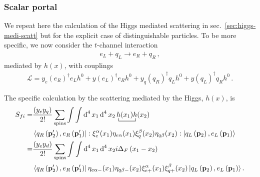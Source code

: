 \subsubsection{Scalar portal}

\begin{frame}
We repeat here the calculation of the Higgs mediated scattering in sec.~\ref{sec:higgs-medi-scatt} but for the explicit case of distinguishable particles. To be more specific, 
we now consider the $t$-channel interaction
\begin{align}
  e_L+q_L \to e_R+q_R\,,
\end{align}
mediated by $h(x)$, with couplings
\begin{align}
\label{eq:xietaz}
\mathcal{L}= y_e \left(e_R\right)^{\dagger} e_L h^0 +y \left(e_L\right)^{\dagger} e_R h^0 
+y_q \left(q_R\right)^{\dagger} q_L h^0 +y \left(q_L\right)^{\dagger} q_R h^0 \,.
\end{align}


The specific calculation by the scattering mediated by the Higgs, $h(x)$, is 
\begin{align}
  S_{fi}=&\frac{\left(y_ey_q \right)}{2!}\sum_{\text{spins}}\int\int \operatorname{d}^4x_1 \operatorname{d}^4x_2
\bcontraction{\,}{h}{(x_1)}{h}\,h(x_1)h(x_2) \nonumber\\
&\left\langle q_R \left(\mathbf{p}'_2\right),e_R\left(\mathbf{p}'_1\right) \right|
  : \xi^{\alpha}_{e}(x_1)\eta_{e\alpha}(x_1)
    \xi^{\beta}_{q}(x_2)\eta_{q\beta}(x_2):
 \left| q_L\left(\mathbf{p}_2\right) ,e_L \left(\mathbf{p}_1\right)  \right\rangle \nonumber\\
=&\frac{\left( y_ey_d \right)}{2!}\sum_{\text{spins}}\int\int \operatorname{d}^4x_1 \operatorname{d}^4x_2
i\Delta_F \left( x_1-x_2 \right)\nonumber\\
&\left\langle q_R \left(\mathbf{p}'_2\right),e_R\left(\mathbf{p}'_1\right)\right|
   \eta_{e\alpha-}(x_1)\eta_{q\beta-}(x_2) \xi^{\alpha}_{e+}(x_1)\xi^{\beta}_{q+}(x_2)
 \left| q_L\left(\mathbf{p}_2\right), e_L \left(\mathbf{p}_1\right)\right\rangle. 
\end{align}




\end{frame}
